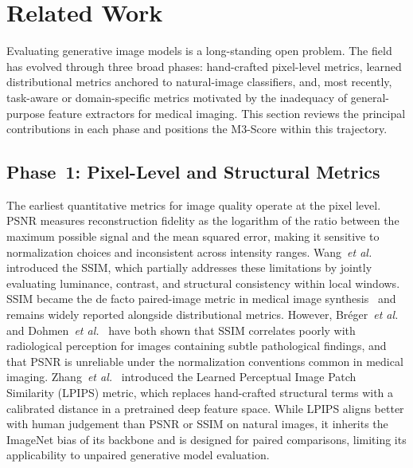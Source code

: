 \documentclass[lettersize,journal]{IEEEtran}
\begin{document}
\section{Related Work}
\label{sec:related}
 
Evaluating generative image models is a long-standing open problem.
The field has evolved through three broad phases: hand-crafted pixel-level
metrics, learned distributional metrics anchored to natural-image
classifiers, and, most recently, task-aware or domain-specific metrics
motivated by the inadequacy of general-purpose feature extractors for
medical imaging.
This section reviews the principal contributions in each phase and
positions the M3-Score within this trajectory.
 
\subsection{Phase~1: Pixel-Level and Structural Metrics}
\label{sec:related_phase1}

The earliest quantitative metrics for image quality operate at the pixel
level. PSNR measures reconstruction fidelity
as the logarithm of the ratio between the maximum possible signal and the
mean squared error, making it sensitive to normalization choices and
inconsistent across intensity ranges. Wang~\textit{et al.}~\cite{wang2004image}
introduced the SSIM, which partially addresses
these limitations by jointly evaluating luminance, contrast, and structural
consistency within local windows. SSIM became the de facto paired-image
metric in medical image synthesis~\cite{dohmen2025similarity} and remains
widely reported alongside distributional metrics. However,
Br\'{e}ger~\textit{et al.}~\cite{breger2025study} and
Dohmen~\textit{et al.}~\cite{dohmen2025similarity} have both shown that
SSIM correlates poorly with radiological perception for images containing
subtle pathological findings, and that PSNR is unreliable under the
normalization conventions common in medical imaging.
Zhang~\textit{et al.}~\cite{zhang2018lpips} introduced the Learned
Perceptual Image Patch Similarity (LPIPS) metric, which replaces hand-crafted
structural terms with a calibrated distance in a pretrained deep feature
space. While LPIPS aligns better with human judgement than PSNR or SSIM on
natural images, it inherits the ImageNet bias of its backbone and is designed
for paired comparisons, limiting its applicability to unpaired generative
model evaluation.
\end{document}
